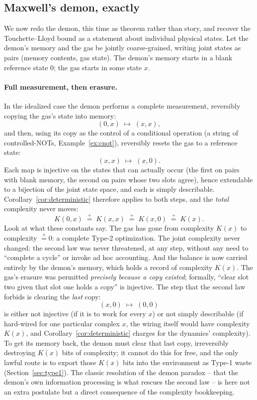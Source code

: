 \documentclass[10pt]{article}
\theoremstyle{definition}
\theoremstyle{remark}
\newcommand{\peq}{\mathrel{\stackrel{+}{=}}}
\begin{document}
\subsection{Maxwell's demon, exactly}
\label{sec:demon}

We now redo the demon, this time as theorem rather than story, and recover the Touchette--Lloyd bound as a statement about individual physical states. Let the demon's memory and the gas be jointly coarse-grained, writing joint states as pairs (memory contents, gas state). The demon's memory starts in a blank reference state $0$; the gas starts in some state $x$.

\paragraph{Full measurement, then erasure.} In the idealized case the demon performs a complete measurement, reversibly copying the gas's state into memory:
\[
(0, x) \;\mapsto\; (x, x),
\]
and then, using its copy as the control of a conditional operation (a string of controlled-NOTs, Example~\ref{ex:cnot}), reversibly resets the gas to a reference state:
\[
(x, x) \;\mapsto\; (x, 0).
\]
Each map is injective on the states that can actually occur (the first on pairs with blank memory, the second on pairs whose two slots agree), hence extendable to a bijection of the joint state space, and each is simply describable. Corollary~\ref{cor:deterministic} therefore applies to both steps, and the \emph{total} complexity never moves:
\[
K(0, x) \;\peq\; K(x, x) \;\peq\; K(x, 0) \;\peq\; K(x).
\]
Look at what these constants say. The gas has gone from complexity $K(x)$ to complexity $\peq 0$: a complete Type-2 optimization. The joint complexity never changed: the second law was never threatened, at any step, without any need to ``complete a cycle'' or invoke ad hoc accounting. And the balance is now carried entirely by the demon's memory, which holds a record of complexity $K(x)$. The gas's erasure was permitted \emph{precisely because a copy existed}; formally, ``clear slot two given that slot one holds a copy'' is injective. The step that the second law forbids is clearing the \emph{last} copy:
\[
(x, 0) \;\mapsto\; (0, 0)
\]
is either not injective (if it is to work for every $x$) or not simply describable (if hard-wired for one particular complex $x$, the wiring itself would have complexity $K(x)$, and Corollary~\ref{cor:deterministic} charges for the dynamics' complexity). To get its memory back, the demon must clear that last copy, irreversibly destroying $K(x)$ bits of complexity; it cannot do this for free, and the only lawful route is to export those $K(x)$ bits into the environment as Type-1 waste (Section~\ref{sec:type1}). The classic resolution of the demon paradox -- that the demon's own information processing is what rescues the second law -- is here not an extra postulate but a direct consequence of the complexity bookkeeping.
\end{document}
